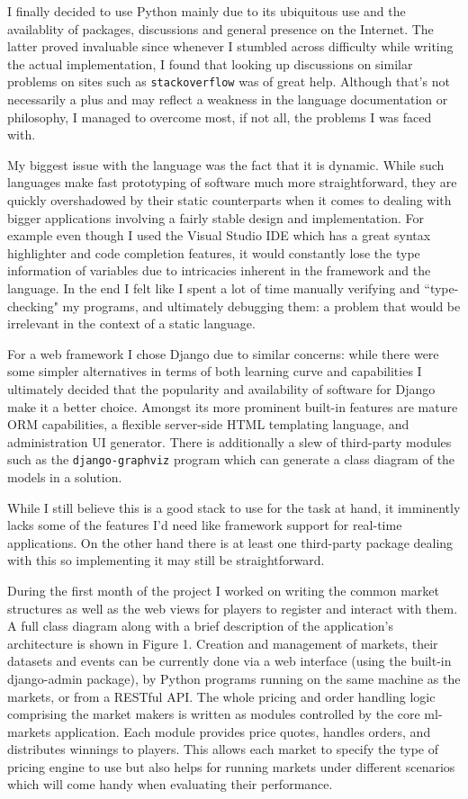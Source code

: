 \documentclass[bsc,frontabs,twoside,singlespacing,parskip,deptreport]{infthesis}     %
\begin{document}
	I finally decided to use Python mainly due to its ubiquitous use and the availablity of packages, discussions and general presence on the Internet. The latter proved invaluable since whenever I stumbled across difficulty while writing the actual implementation, I found that looking up discussions on similar problems on sites such as {\tt stackoverflow} was of great help. Although that's not necessarily a plus and may reflect a weakness in the language documentation or philosophy, I managed to overcome most, if not all, the problems I was faced with. 

	My biggest issue with the language was the fact that it is dynamic. While such languages make fast prototyping of software much more straightforward, they are quickly overshadowed by their static counterparts when it comes to dealing with bigger applications involving a fairly stable design and implementation. For example even though I used the Visual Studio IDE which has a great syntax highlighter and code completion features, it would constantly lose the type information of variables due to intricacies inherent in the framework and the language. In the end I felt like I spent a lot of time manually verifying and ``type-checking" my programs, and ultimately debugging them: a problem that would be irrelevant in the context of a static language. 
	
	For a web framework I chose Django due to similar concerns: while there were some simpler alternatives in terms of both learning curve and capabilities I ultimately decided that the popularity and availability of software for Django make it a better choice. Amongst its more prominent built-in features are mature ORM capabilities, a flexible server-side HTML templating language, and administration UI generator. There is additionally a slew of third-party modules such as the {\tt django-graphviz} program which can generate a class diagram of the models in a solution. 

    While I still believe this is a good stack to use for the task at hand, it imminently lacks some of the features I’d need like framework support for real-time applications. On the other hand there is at least one third-party package dealing with this so implementing it may still be straightforward. 
	

	
	During the first month of the project I worked on writing the common market structures as well as the web views for players to register and interact with them. A full class diagram along with a brief description of the application’s architecture is shown in Figure 1. Creation and management of markets, their datasets and events can be currently done via a web interface (using the built-in django-admin package), by Python programs running on the same machine as the markets, or from a RESTful API.
The whole pricing and order handling logic comprising the market makers is written as modules controlled by the core ml-markets application. Each module provides price quotes, handles orders, and distributes winnings to players. This allows each market to specify the type of pricing engine to use but also helps for running markets under different scenarios which will come handy when evaluating their performance.  
\end{document}
